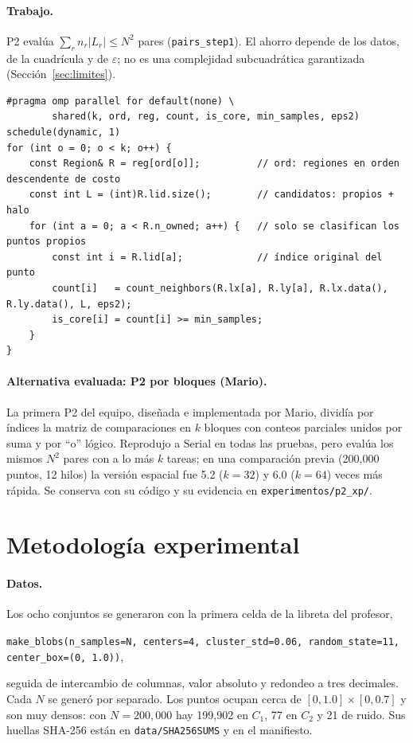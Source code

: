 \documentclass[11pt,letterpaper]{article}
\newcommand{\code}[1]{\texttt{#1}}
\begin{document}
\paragraph{Trabajo.} P2 evalúa $\sum_r n_r|L_r|\le N^2$ pares (\code{pairs\_step1}). El ahorro depende de los
datos, de la cuadrícula y de $\varepsilon$; no es una complejidad subcuadrática garantizada
(Sección~\ref{sec:limites}).

\begin{lstlisting}[float=t,caption={Paso 1 de P2: una tarea por región, de la más costosa a la menos costosa.},label={lst:p2}]
#pragma omp parallel for default(none) \
        shared(k, ord, reg, count, is_core, min_samples, eps2) schedule(dynamic, 1)
for (int o = 0; o < k; o++) {
    const Region& R = reg[ord[o]];          // ord: regiones en orden descendente de costo
    const int L = (int)R.lid.size();        // candidatos: propios + halo
    for (int a = 0; a < R.n_owned; a++) {   // solo se clasifican los puntos propios
        const int i = R.lid[a];             // índice original del punto
        count[i]   = count_neighbors(R.lx[a], R.ly[a], R.lx.data(), R.ly.data(), L, eps2);
        is_core[i] = count[i] >= min_samples;
    }
}
\end{lstlisting}

\paragraph{Alternativa evaluada: P2 por bloques (Mario).} La primera P2 del equipo, diseñada e implementada por
Mario, dividía por índices la matriz de comparaciones en $k$ bloques con conteos parciales unidos por suma y por ``o''
lógico. Reprodujo a Serial en todas las pruebas, pero evalúa los mismos $N^2$ pares con a lo más $k$ tareas; en una
comparación previa (200,000 puntos, 12 hilos) la versión espacial fue 5.2 ($k=32$) y 6.0 ($k=64$) veces más rápida.
Se conserva con su código y su evidencia en \code{experimentos/p2\_xp/}.

\section{Metodología experimental}\label{sec:metodo}

\paragraph{Datos.} Los ocho conjuntos se generaron con la primera celda de la libreta del profesor,
\begin{center}\footnotesize
\code{make\_blobs(n\_samples=N, centers=4, cluster\_std=0.06, random\_state=11, center\_box=(0, 1.0))},
\end{center}
seguida de intercambio de columnas, valor absoluto y redondeo a tres decimales. Cada $N$ se generó por separado. Los puntos ocupan cerca de $[0,1.0]\times[0,0.7]$ y son muy densos: con $N=200{,}000$ hay 199,902 en
$C_1$, 77 en $C_2$ y 21 de ruido. Sus huellas SHA-256 están en \code{data/SHA256SUMS} y en el manifiesto.
\end{document}

